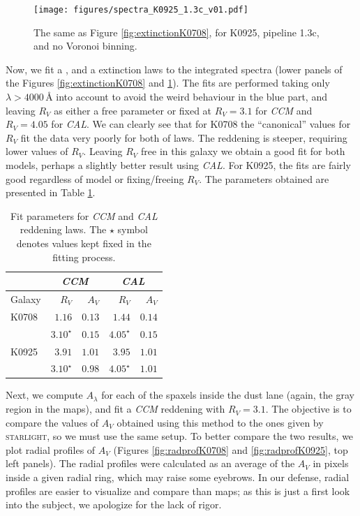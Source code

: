 \documentclass[a4paper]{article}
\newcommand{\angstrom}{\text{\AA}}
\def\starlight{\textsc{starlight}\xspace}
\def\CCM{\textit{CCM}\xspace}
\def\CAL{\textit{CAL}\xspace}
\begin{document}
\begin{figure}
\texttt{[image: figures/spectra\_K0925\_1.3c\_v01.pdf]}
\caption{The same as Figure \ref{fig:extinctionK0708}, for K0925, pipeline 1.3c, and
no Voronoi binning.}
\label{fig:extinctionK0925}
\end{figure}

Now, we fit a \citet*[hereafter \CCM, blue in the $A_\lambda$
plots]{CCM1989}, and a \citet*[hereafter \CAL, red in the $A_\lambda$
plots]{Calzetti1994} extinction laws to the integrated spectra (lower
panels of the Figures \ref{fig:extinctionK0708} and
\ref{fig:extinctionK0925}). The fits are performed taking only
$\lambda > 4000\,\angstrom$ into account to avoid the weird behaviour
in the blue part, and leaving $R_V$ as either a free parameter or
fixed at $R_V = 3.1$ for \CCM and $R_V = 4.05$ for \CAL. We can
clearly see that for K0708 the ``canonical'' values for $R_V$ fit the
data very poorly for both of laws. The reddening is steeper,
requiring lower values of $R_V$.  Leaving $R_V$ free in this galaxy we
obtain a good fit for both models, perhaps a slightly better result
using \CAL. For K0925, the fits are fairly good regardless of model or
fixing/freeing $R_V$. The parameters obtained are presented in Table
\ref{tab:params}.

\begin{table}
\caption{Fit parameters for \CCM and \CAL reddening laws. The $\star$ symbol
denotes values kept fixed in the fitting process.}
\label{tab:params}
\begin{center}
\begin{tabular}{l | r r | r r}
\hline
       & \multicolumn{2}{c}{\CCM} & \multicolumn{2}{c}{\CAL} \\
\hline
Galaxy & $R_V$        & $A_V$           & $R_V$        & $A_V$  \\
\hline
K0708  & $1.16$       & $0.13$          & $1.44$       & $0.14$ \\
       & $3.10^\star$ & $0.15$          & $4.05^\star$ & $0.15$ \\
K0925  & $3.91$       & $1.01$          & $3.95$       & $1.01$ \\
       & $3.10^\star$ & $0.98$          & $4.05^\star$ & $1.01$ \\
\hline
\end{tabular}
\end{center}
\end{table}

Next, we compute $A_\lambda$ for each of the spaxels inside the dust lane
(again, the gray region in the maps), and fit a \CCM reddening with $R_V = 3.1$.
The objective is to compare the values of $A_V$ obtained using this method to
the ones given by \starlight, so we must use the same setup. To better compare
the two results, we plot radial profiles of $A_V$ (Figures
\ref{fig:radprofK0708} and \ref{fig:radprofK0925}, top left panels). The radial
profiles were calculated as an average of the $A_V$ in pixels inside a given
radial ring, which may raise some eyebrows. In our defense, radial profiles are
easier to visualize and compare than maps; as this is just a first look into the
subject, we apologize for the lack of rigor.
\end{document}
